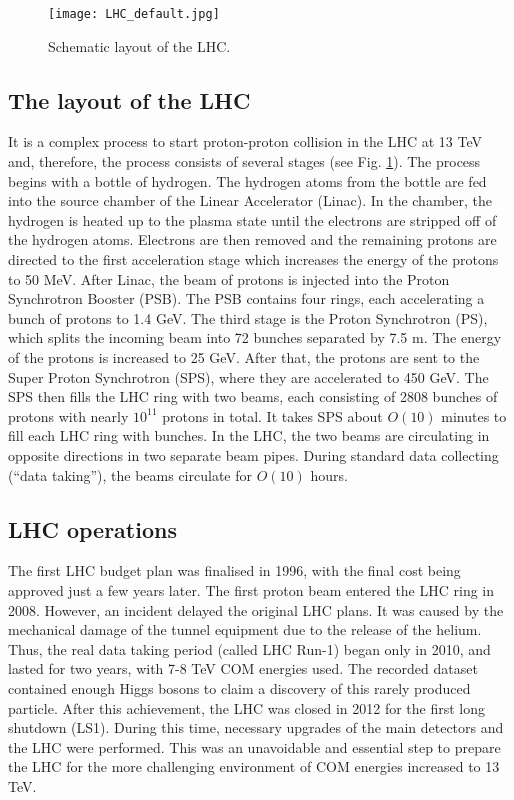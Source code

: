 \begin{normalsize}
\begin{figure}[H]
  \centering
  \texttt{[image: LHC\_default.jpg]}
  \caption {Schematic layout of the LHC.}
  \label{lhcmap}
\end{figure}



\subsection{The layout of the LHC}

It is a complex process to start proton-proton collision in the LHC at 13 TeV and, therefore, the process consists of several stages (see Fig. \ref{lhcmap}). The process begins with a bottle of hydrogen. The hydrogen atoms from the bottle are fed into the source chamber of the Linear Accelerator (Linac). In the chamber, the hydrogen is heated up to the plasma state until the electrons are stripped off of the hydrogen atoms. Electrons are then removed and the remaining protons are directed to the first acceleration stage which increases the energy of the protons to 50 MeV. After Linac, the beam of protons is injected into the Proton Synchrotron Booster (PSB). The PSB contains four rings, each accelerating a bunch of protons to 1.4 GeV. The third stage is the Proton Synchrotron (PS), which splits the incoming beam into 72 bunches separated by 7.5 m. The energy of the protons is increased to 25 GeV. After that, the protons are sent to the Super Proton Synchrotron (SPS), where they are accelerated to 450 GeV. The SPS then fills the LHC ring with two beams, each consisting of 2808 bunches of protons with nearly $10^{11}$ protons in total. It takes SPS about $O(10)$ minutes to fill each LHC ring with bunches. In the LHC, the two beams are circulating in opposite directions in two separate beam pipes. During standard data collecting (``data taking''), the beams circulate for $O(10)$ hours.  

\subsection{LHC operations}

The first LHC budget plan was finalised in 1996, with the final cost being approved just a few years later. The first proton beam entered the LHC ring in 2008. However, an incident delayed the original LHC plans. It was caused by the mechanical damage of the tunnel equipment due to the release of the helium. Thus, the real data taking period (called LHC Run-1) began only in 2010, and lasted for two years, with 7-8 TeV COM energies used. The recorded dataset contained enough Higgs bosons to claim a discovery of this rarely produced particle. After this achievement, the LHC was closed in 2012 for the first long shutdown (LS1). During this time, necessary upgrades of the main detectors and the LHC were performed. This was an unavoidable and essential step to prepare the LHC for the more challenging environment of COM energies increased to 13 TeV. 



\end{normalsize}
